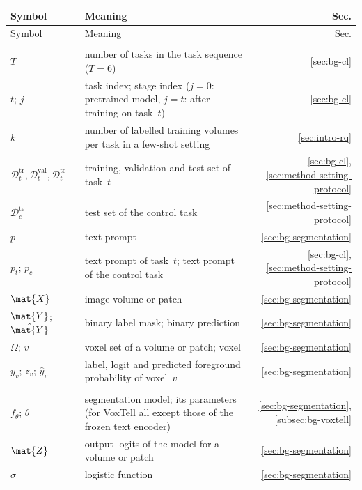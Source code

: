 {\small
\renewcommand{\arraystretch}{1.15}
\begin{longtable}{@{}>{\raggedright\arraybackslash}p{3.4cm}>{\raggedright\arraybackslash}p{10.2cm}r@{}}
\toprule
Symbol & Meaning & Sec. \\
\midrule
\endfirsthead
\toprule
Symbol & Meaning & Sec. \\
\midrule
\endhead
\bottomrule
\endfoot
\multicolumn{3}{@{}l}{\textit{Tasks and data}} \\
$T$ & number of tasks in the task sequence ($T = 6$) & \ref{sec:bg-cl} \\
$t$; $j$ & task index; stage index ($j = 0$: pretrained model, $j = t$: after training on task~$t$) & \ref{sec:bg-cl} \\
$k$ & number of labelled training volumes per task in a few-shot setting & \ref{sec:intro-rq} \\
$\mathcal{D}_t^{\mathrm{tr}}, \mathcal{D}_t^{\mathrm{val}}, \mathcal{D}_t^{\mathrm{te}}$ & training, validation and test set of task~$t$ & \ref{sec:bg-cl}, \ref{sec:method-setting-protocol} \\
$\mathcal{D}_c^{\mathrm{te}}$ & test set of the control task & \ref{sec:method-setting-protocol} \\
$p$ & text prompt & \ref{sec:bg-segmentation} \\
$p_t$; $p_c$ & text prompt of task~$t$; text prompt of the control task & \ref{sec:bg-cl}, \ref{sec:method-setting-protocol} \\
$\mat{X}$ & image volume or patch & \ref{sec:bg-segmentation} \\
$\mat{Y}$; $\hat{\mat{Y}}$ & binary label mask; binary prediction & \ref{sec:bg-segmentation} \\
$\Omega$; $v$ & voxel set of a volume or patch; voxel & \ref{sec:bg-segmentation} \\
$y_v$; $z_v$; $\hat{y}_v$ & label, logit and predicted foreground probability of voxel~$v$ & \ref{sec:bg-segmentation} \\
\addlinespace
\multicolumn{3}{@{}l}{\textit{Model}} \\*
$f_\theta$; $\theta$ & segmentation model; its parameters (for VoxTell all except those of the frozen text encoder) & \ref{sec:bg-segmentation}, \ref{subsec:bg-voxtell} \\
$\mat{Z}$ & output logits of the model for a volume or patch & \ref{sec:bg-segmentation} \\
$\sigma$ & logistic function & \ref{sec:bg-segmentation} \\

\end{longtable}}
